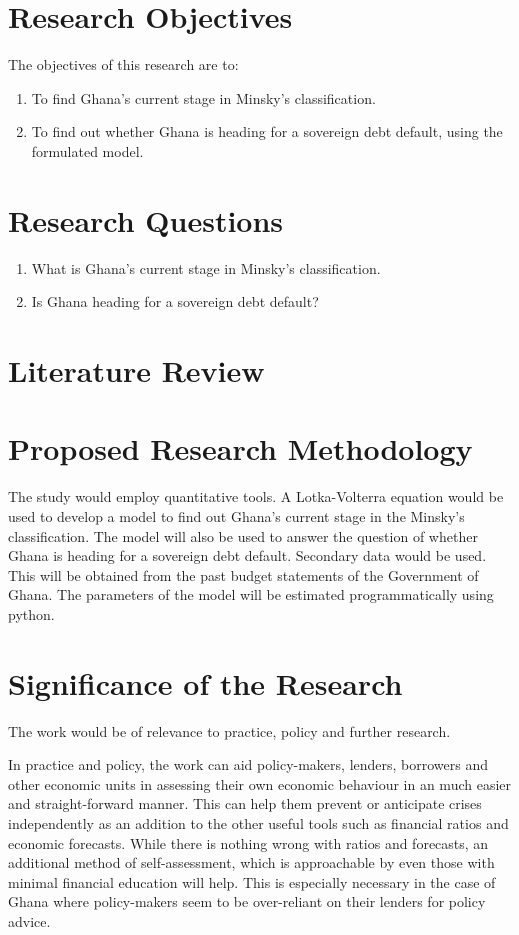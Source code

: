 \documentclass[a4paper]{article}
\begin{document}
	\section{Research Objectives}
	The objectives of this research are to:
	
	\begin{enumerate}
		\item To find Ghana's current stage in Minsky's classification.
		
		\item To find out whether Ghana is heading for a sovereign debt default, using the formulated model.
	\end{enumerate}
	\section{Research Questions}
	\begin{enumerate}
		\item What is Ghana's current stage in Minsky's classification.
		
		\item Is Ghana heading for a sovereign debt default?
	\end{enumerate}
	\section{Literature Review}
	\section{Proposed Research Methodology}
	The study would employ quantitative  tools. A Lotka-Volterra equation would be used to develop a model to find out Ghana's current stage in the Minsky's classification. The model will also be used to answer the question of whether Ghana is heading for a sovereign debt default. Secondary data would be used. This will be obtained from the past budget statements of the Government of Ghana. The parameters of the model will be estimated programmatically using python.
	\section{Significance of the Research}
	The work would be of relevance to practice, policy and further research.
	
	In practice and policy, the work can aid policy-makers, lenders, borrowers and other economic units in assessing their own economic behaviour in an much easier and straight-forward manner. This can help them prevent or anticipate crises independently as an addition to the other useful tools such as financial ratios and economic forecasts. While there is nothing wrong with ratios and forecasts, an additional method of self-assessment, which is approachable by even those with minimal financial education will help. This is especially necessary in the case of Ghana where policy-makers seem to be over-reliant on their lenders for policy advice.
	
\end{document}

